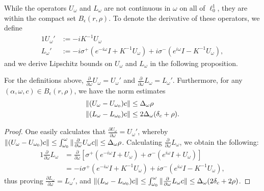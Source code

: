 While the operators $U_\omega$ and $L_\omega$ are not continuous in $ \omega$ on all of $ \ell^1_0$, they are within the compact set $ B_\epsilon(r,\rho)$. 
To denote the derivative of these operators, we  define
\begin{alignat}{1}
	U_{\omega}' &:=  - i K^{-1} U_{\omega} \nonumber \\
	L_{\omega}' &:= - i \sigma^+( e^{- i \omega} I + K^{-1} U_{\omega}) + i \sigma^-(e^{i \omega} I - K^{-1} U_{\omega})  , \label{e:Lomegaprime}
\end{alignat}
and we derive Lipschitz bounds on $U_\omega$ and $L_\omega$ in the following proposition.
 
\begin{proposition}
	\label{prop:OmegaDerivatives}
	For the definitions above, $ \frac{\partial }{\partial  \omega} U_\omega = U_{\omega}' $ and $ \frac{\partial }{\partial  \omega}  L_\omega= L_{\omega}' $. 
	Furthermore,  for any $ (\alpha, \omega,c) \in B_\epsilon(r,\rho)$, we have the norm estimates
	\begin{alignat}{1}
	\| (U_{\omega} - U_{\omega_0} )c \| &\leq   \Delta_\omega  \rho \nonumber  \\
	\|( L_{\omega} - L_{\omega_0} )c \| &\leq  2  \Delta_\omega (  \delta_c +  \rho) .
	\label{e:LomegaLip}
	\end{alignat}
\end{proposition}

\begin{proof}
One easily calculates that $ \frac{\partial U_\omega}{\partial  \omega} =  U_{\omega}'$,  whereby
$
	\| (U_{\omega} - U_{\omega_0} )c \| \leq \int_{\omega_0}^\omega \| \tfrac{\partial}{\partial \omega} U_\omega c \|  \leq    \Delta_\omega  \rho  
$. 
Calculating $ \frac{\partial }{\partial  \omega}  L_{\omega} $, we obtain the following:
\begin{alignat*}{1}
 \frac{\partial }{\partial  \omega}  L_{\omega} 
&=  \frac{\partial }{\partial  \omega} \left[  \sigma^+( e^{- i \omega} I + U_{\omega}) + \sigma^-(e^{i \omega} I + U_{\omega}) \right] \\
&= - i \sigma^+( e^{- i \omega} I + K^{-1} U_{\omega}) + i \sigma^-(e^{i \omega} I - K^{-1} U_{\omega}) ,
\end{alignat*}
thus proving $ \frac{\partial L_\omega}{\partial  \omega} =  L_{\omega}'$,
and 
$\|( L_{\omega} - L_{\omega_0} )c \| \leq  \int_{\omega_0}^\omega \| \tfrac{\partial}{\partial \omega} L_\omega c \|  \leq   \Delta_\omega ( 2  \delta_c + 2 \rho)$.
\end{proof}

